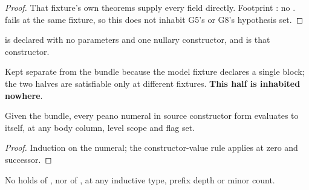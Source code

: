\begin{proof} \leanok
{}
 That fixture's own theorems supply every field directly. Footprint
: no .  fails at the
same fixture, so this does not inhabit G5's or G8's hypothesis set.
\end{proof}

\begin{definition}\label{def:Green-SpikeUnitFacts}
 \leanok
{}
 is declared with no parameters and one nullary constructor, and  is
that constructor.
\end{definition}

\begin{remark}
 Kept separate from the  bundle because the model fixture declares a single
block; the two halves are satisfiable only at different fixtures. \textbf{This half is inhabited
nowhere}.
\end{remark}

\begin{lemma}\label{lem:Green-peanoSrc_eval}
 \leanok
{}
Given the  bundle, every peano numeral in source constructor form evaluates to itself, at
any body column, level scope and flag set.
\end{lemma}

\begin{proof} \leanok
{}
 Induction on the numeral; the constructor-value rule applies at zero and successor.
\end{proof}

\begin{lemma}\label{lem:Green-not_casesOn_spikeCase}
 \leanok
{}
No  holds of , nor of , at any inductive type,
prefix depth or minor count.
\end{lemma}

